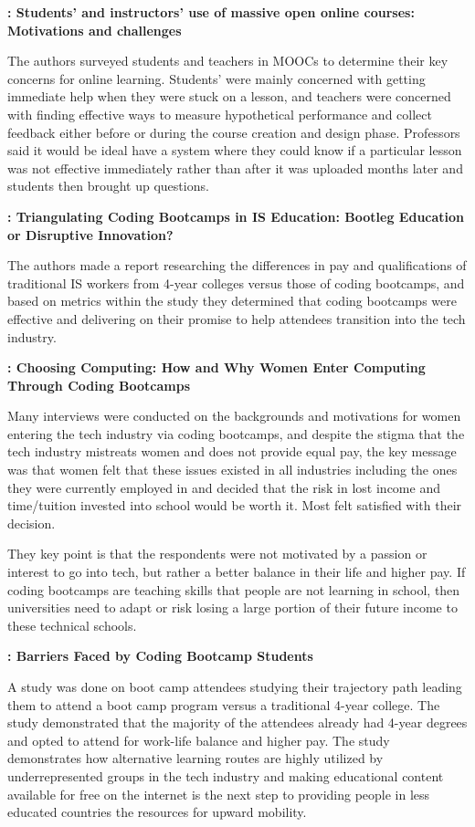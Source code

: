\documentclass[
	letterpaper, %
]{jdf}
\begin{document}
\textbf{\cite{hew14}: Students’ and instructors’ use of massive open online courses: Motivations and challenges}

The authors surveyed students and teachers in MOOCs to determine their key concerns for online learning. Students' were mainly concerned with getting immediate help when they were stuck on a lesson, and teachers were concerned with finding effective ways to measure hypothetical performance and collect feedback either before or during the course creation and design phase. Professors said it would be ideal have a system where they could know if a particular lesson was not effective immediately rather than after it was uploaded months later and students then brought up questions.

\textbf{\cite{6}: Triangulating Coding Bootcamps in IS Education: Bootleg Education or Disruptive Innovation?}

The authors made a report researching the differences in pay and qualifications of traditional IS workers from 4-year colleges versus those of coding bootcamps, and based on metrics within the study they determined that coding bootcamps were effective and delivering on their promise to help attendees transition into the tech industry.

\textbf{\cite{7}: Choosing Computing: How and Why Women Enter Computing Through Coding Bootcamps}

Many interviews were conducted on the backgrounds and motivations for women entering the tech industry via coding bootcamps, and despite the stigma that the tech industry mistreats women and does not provide equal pay, the key message was that women felt that these issues existed in all industries including the ones they were currently employed in and decided that the risk in lost income and time/tuition invested into school would be worth it. Most felt satisfied with their decision. 

They key point is that the respondents were not motivated by a passion or interest to go into tech, but rather a better balance in their life and higher pay. If coding bootcamps are teaching skills that people are not learning in school, then universities need to adapt or risk losing a large portion of their future income to these technical schools. 

\textbf{\cite{5}: Barriers Faced by Coding Bootcamp Students}

A study was done on boot camp attendees studying their trajectory path leading them to attend a boot camp program versus a traditional 4-year college. The study demonstrated that the majority of the attendees already had 4-year degrees and opted to attend for work-life balance and higher pay. The study demonstrates how alternative learning routes are highly utilized by underrepresented groups in the tech industry and making educational content available for free on the internet is the next step to providing people in less educated countries the resources for upward mobility.
\end{document}
